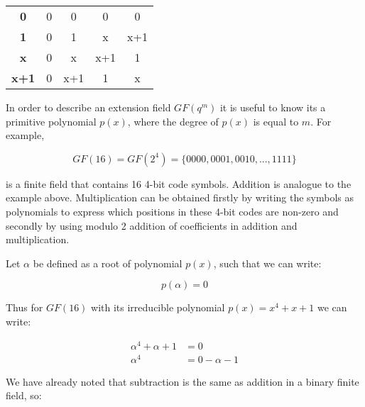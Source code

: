 \documentclass[../main.tex]{subfiles}
\begin{document}
\begin{table}[htp]
\begin{center}
{\begin{minipage}[t]{0.4\textwidth}
\begin{center}
\begin{tabular}{c | c c c c}
                            \hline
                            \textbf{0}      & 0             & 0             & 0             & 0 \\
                            \textbf{1}      & 0             & 1             & x             & x+1 \\
                            \textbf{x}      & 0             & x             & x+1           & 1 \\
                            \textbf{x+1}    & 0             & x+1           & 1             & x \\
                        \end{tabular}
                    \end{center}
                \end{minipage}
            }
        \end{center}
    \end{table}

    In order to describe an extension field ${GF(q^m)}$ it is useful to know its a primitive polynomial ${p(x)}$, where the degree of ${p(x)}$ is equal to ${m}$. For example,

    \begin{equation*}
         GF(16) = GF(2^4) = \{0000, 0001, 0010, ..., 1111\}
    \end{equation*}

    \noindent
    is a finite field that contains 16 4-bit code symbols. Addition is analogue to the example above. Multiplication can be obtained firstly by writing the symbols as polynomials to express which positions in these 4-bit codes are non-zero and secondly by using modulo 2 addition of coefficients in addition and multiplication.

    \noindent
    Let ${\alpha}$ be defined as a root of polynomial ${p(x)}$, such that we can write:

    \begin{equation*}
         p(\alpha) = 0
    \end{equation*}

    \noindent
    Thus for ${GF(16)}$ with its irreducible polynomial ${p(x) = x^4 + x + 1}$ we can write:

    \begin{align*}
        \alpha^4 + \alpha + 1 &= 0 \\
        \alpha^4 &= 0 - \alpha - 1
    \end{align*}

    \noindent
    We have already noted that subtraction is the same as addition in a binary finite field, so:
\end{document}
